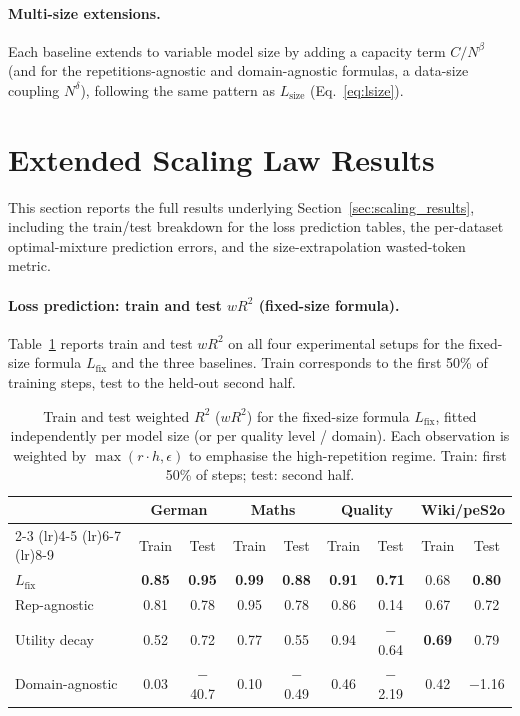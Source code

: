 \paragraph{Multi-size extensions.}
Each baseline extends to variable model size by adding a capacity term $C/N^\beta$ (and for the repetitions-agnostic and domain-agnostic formulas, a data-size coupling $N^\delta$), following the same pattern as $L_\mathrm{size}$ (Eq.~\ref{eq:lsize}).



\section{Extended Scaling Law Results}
\label{app:extended_scaling}

This section reports the full results underlying Section~\ref{sec:scaling_results}, including the train/test breakdown for the loss prediction tables, the per-dataset optimal-mixture prediction errors, and the size-extrapolation wasted-token metric.

\paragraph{Loss prediction: train and test $wR^2$ (fixed-size formula).}
Table~\ref{tab:app_scaling_r2_full} reports train and test $wR^2$ on all four experimental setups for the fixed-size formula $L_\mathrm{fix}$ and the three baselines. Train corresponds to the first 50\% of training steps, test to the held-out second half.

\begin{table}[h]
\centering
\caption{Train and test weighted $R^2$ ($wR^2$) for the fixed-size formula $L_\mathrm{fix}$, fitted independently per model size (or per quality level / domain). Each observation is weighted by $\max(r \cdot h, \epsilon)$ to emphasise the high-repetition regime. Train: first 50\% of steps; test: second half.}
\label{tab:app_scaling_r2_full}
\small
\begin{tabular}{lcccccccc}
\toprule
& \multicolumn{2}{c}{German} & \multicolumn{2}{c}{Maths} & \multicolumn{2}{c}{Quality} & \multicolumn{2}{c}{Wiki/peS2o} \\
\cmidrule(lr){2-3} \cmidrule(lr){4-5} \cmidrule(lr){6-7} \cmidrule(lr){8-9}
& Train & Test & Train & Test & Train & Test & Train & Test \\
\midrule
$L_\mathrm{fix}$ & \textbf{0.85} & \textbf{0.95} & \textbf{0.99} & \textbf{0.88} & \textbf{0.91} & \textbf{0.71} & 0.68 & \textbf{0.80} \\
Rep-agnostic & 0.81 & 0.78 & 0.95 & 0.78 & 0.86 & 0.14 & 0.67 & 0.72 \\
Utility decay & 0.52 & 0.72 & 0.77 & 0.55 & 0.94 & $-$0.64 & \textbf{0.69} & 0.79 \\
Domain-agnostic & 0.03 & $-$40.7 & 0.10 & $-$0.49 & 0.46 & $-$2.19 & 0.42 & $-$1.16 \\
\bottomrule
\end{tabular}
\end{table}

